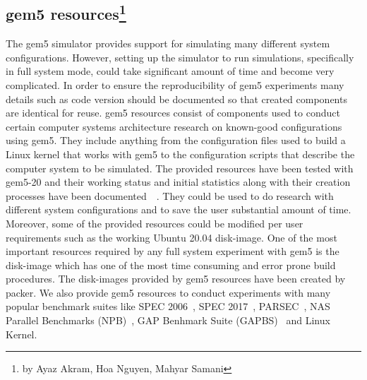 \subsection[gem5 resources]{gem5 resources\footnote{by Ayaz Akram, Hoa Nguyen, Mahyar Samani}}
The gem5 simulator provides support for simulating many different system configurations. However,
setting up the simulator to run simulations, specifically in full system mode, could take significant
amount of time and become very complicated. In order to ensure the reproducibility of gem5 experiments
many details such as code version should be documented so that created components are identical for
reuse. gem5 resources consist of components used to conduct certain computer systems architecture
research on known-good configurations using gem5. They include anything from the configuration
files used to build a Linux kernel that works with gem5 to the configuration scripts that
describe the computer system to be simulated. The provided resources have been tested with gem5-20
and their working status and initial statistics along with their creation processes have been documented~\cite{benchmark_status}~\cite{resources-repo}.
They could be used to do research with different system configurations and to save the user substantial amount of time.
Moreover, some of the provided resources could be modified per user requirements such as the working Ubuntu 20.04 disk-image.
One of the most important resources required by any full system experiment with gem5 is the disk-image
which has one of the most time consuming and error prone build procedures. The disk-images provided by
gem5 resources have been created by packer. We also provide gem5 resources to conduct experiments with many
popular benchmark suites like SPEC 2006~\cite{spec06}, SPEC 2017~\cite{spec17}, PARSEC~\cite{parsec},
NAS Parallel Benchmarks (NPB)~\cite{npb}, GAP Benhmark Suite (GAPBS)~\cite{gapbs} and Linux Kernel.